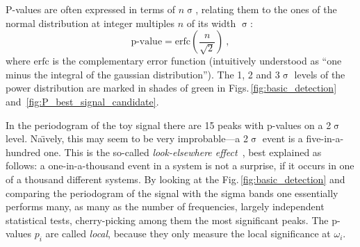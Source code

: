 
P-values are often expressed in terms of $n\upsigma$, relating them to the ones of the normal distribution at integer multiples $n$ of its width $\upsigma$:
\begin{equation}
  \text{p-value} = \mathrm{erfc}\left( \frac{n}{\sqrt{2}} \right)\ ,
\end{equation}
where $\mathrm{erfc}$ is the complementary error function (intuitively understood as ``one minus the integral of the gaussian distribution''). The 1, 2 and 3$\upsigma$ levels of the power distribution are marked in shades of green in Figs.\,\ref{fig:basic_detection} and~\ref{fig:P_best_signal_candidate}.

In the periodogram of the toy signal there are 15 peaks with p-values on a 2$\upsigma$ level. Na\"\i vely, this may seem to be very improbable---a 2$\upsigma$ event is a five-in-a-hundred one. This is the so-called \emph{look-elsewhere effect}~\cite{PDG2016}, best explained as follows: a one-in-a-thousand event in a system is not a surprise, if it occurs in one of a thousand different systems. By looking at the Fig.\,\ref{fig:basic_detection} and comparing the periodogram of the signal with the sigma bands one essentially performs many, as many as the number of frequencies, largely independent statistical tests, cherry-picking among them the most significant peaks. The p-values $p_i$ are called \emph{local}, because they only measure the local significance at $\omega_i$.

